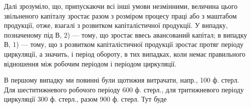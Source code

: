Далі зрозуміло, що, припускаючи всі інші умови незмінними, величина
цього звільненого капіталу зростає разом з розміром процесу праці
або з маштабом продукції, отже, взагалі з розвитком капіталістичної
продукції. У випадку, позначеному під В, 2) — тому, що зростає ввесь
авансований капітал; в випадку В, 1) — тому, що з розвитком капіталістичної
продукції зростає протяг періоду циркуляції, а значить, і період
обороту, в тих випадках, коли немає правильного відношення між робочим
періодом і періодом циркуляції.

В першому випадку ми повинні були щотижня витрачати, напр.,
100 ф. стерл. Для шеститижневого робочого періоду 600 ф. стерл., для тритижневого
періоду циркуляції 300 ф. стерл., разом 900 ф. стерл. Тут буде
\parbreak{}  %
